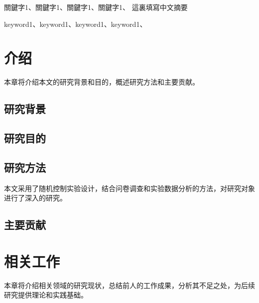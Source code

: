 \documentclass[
    writingLanguage=chinese,
    addPageTitle=yes,
    AddDeclaration=yes,
    addMUSTlog=no,
    refUnindent=yes,
    printing=no,
]{.def/must}
\begin{document}
\begin{abstract@cn}{關鍵字1、關鍵字1、關鍵字1、關鍵字1、}
這裏填寫中文摘要
\end{abstract@cn}

\begin{abstract@en}{keyword1、keyword1、keyword1、keyword1、}
\end{abstract@en}

\addtableofcontents

\section{介绍}

本章将介绍本文的研究背景和目的，概述研究方法和主要贡献。

\subsection{研究背景}

\txtHere[1]

\subsection{研究目的}

\txtHere[2]

\subsection{研究方法}

本文采用了随机控制实验设计，结合问卷调查和实验数据分析的方法，对研究对象进行了深入的研究。

\subsection{主要贡献}

\txtHere[3]

\section{相关工作}

本章将介绍相关领域的研究现状，总结前人的工作成果，分析其不足之处，为后续研究提供理论和实践基础。\citep{wangzhenwu2004, wenzaowai2009, qiuziheng2017, hedingzhao2019, qiujiongyou2014b, qiujiongyou9999, linjing2018, linwenyao2018, linxhui2014, chenyaning9999, luey2013, wendamao2015, qiujiongyou2014a, abdoh2019, bordwell2013, bourdieu1990, cole1992, harvey2007, johnson2018, macdonald2020, manguel2009b, milliot9999, poff2019, villazón2011, manguel2009a}
\end{document}

